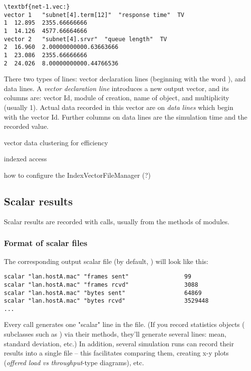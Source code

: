 \begin{Verbatim}[commandchars=\\\{\}]
\textbf{net-1.vec:}
vector 1   "subnet[4].term[12]"  "response time"  TV
1  12.895  2355.66666666
1  14.126  4577.66664666
vector 2   "subnet[4].srvr"  "queue length"  TV
2  16.960  2.00000000000.63663666
1  23.086  2355.66666666
2  24.026  8.00000000000.44766536
\end{Verbatim}

There two types of lines: vector declaration lines (beginning with
the word ), and data lines.
A \textit{vector declaration line} introduces a new output vector, and
its columns are: vector Id, module of creation, name of 
object, and multiplicity (usually 1). Actual data recorded in this
vector are on \textit{data lines} which begin with the vector Id.
Further columns on data lines are the simulation time and the recorded value.

vector data clustering for efficiency

indexed access

how to configure the IndexVectorFileManager (?)


\subsection{Scalar results}

Scalar results are recorded with  calls,
usually from the  methods of modules.


\subsubsection{Format of scalar files}

The corresponding output scalar file (by default, )
will look like this:

\begin{verbatim}
scalar "lan.hostA.mac" "frames sent"                99
scalar "lan.hostA.mac" "frames rcvd"                3088
scalar "lan.hostA.mac" "bytes sent"                 64869
scalar "lan.hostA.mac" "bytes rcvd"                 3529448
...
\end{verbatim}

Every  call generates one "scalar" line in the file.
(If you record statistics objects ( subclasses
such as ) via their  methods,
they'll generate several lines: mean, standard deviation, etc.)
In addition, several simulation runs can record their results into a single file --
this facilitates comparing them, creating x-y plots
(\textit{offered load vs throughput}-type diagrams), etc.



